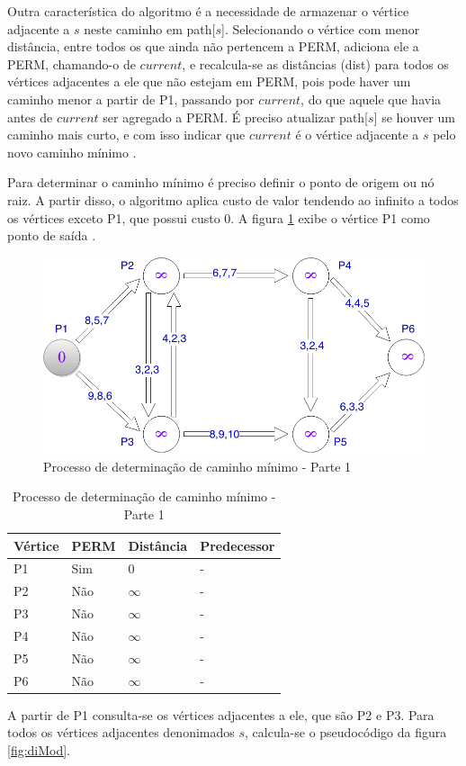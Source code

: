 Outra característica do algoritmo é a necessidade de armazenar o vértice adjacente
a $s$ neste caminho em path[$s$]. Selecionando o vértice com menor distância, entre todos os que ainda não pertencem
a PERM, adiciona ele a PERM, chamando-o de $current$, e recalcula-se as distâncias (dist) para todos os vértices
adjacentes a ele que não estejam em PERM, pois pode haver um caminho menor a partir de P1, passando por $current$, 
do que aquele que havia antes de $current$ ser agregado a PERM. É preciso atualizar path[$s$] se houver um caminho
mais curto, e com isso indicar que $current$ é o vértice adjacente a $s$ pelo novo caminho mínimo \cite{leonard}.

Para determinar o caminho mínimo é preciso definir o ponto de origem ou nó raiz. A partir disso, o algoritmo
aplica custo de valor tendendo ao infinito a todos os vértices exceto P1, que possui custo 0. A figura \ref{fig:leo2} exibe
o vértice P1 como ponto de saída .

\begin{figure}[htbp]
\centering
 \includegraphics[width=.50\textwidth]{chapters/fig/leo2.png}
\caption{Processo de determinação de caminho mínimo - Parte 1}
\label{fig:leo2}
\end{figure}

\begin{table}[htbp]
	\centering
	\begin{tabular}{l l l l}
	\toprule
	Vértice & PERM & Distância & Predecessor\\
	\midrule
	P1 & Sim & 0 & - \\
	P2 & Não & $\infty$ & - \\
	P3 & Não & $\infty$ & - \\
	P4 & Não & $\infty$ & - \\
	P5 & Não & $\infty$ & - \\
	P6 & Não & $\infty$ & - \\
	\bottomrule
	\end{tabular}
\caption{Processo de determinação de caminho mínimo - Parte 1}
 \label{tab:leotab1}
\end{table}
\FloatBarrier

A partir de P1 consulta-se os vértices adjacentes a ele, que são P2 e P3. Para todos os vértices
adjacentes denonimados $s$, calcula-se o pseudocódigo da figura \ref{fig:diMod}.

